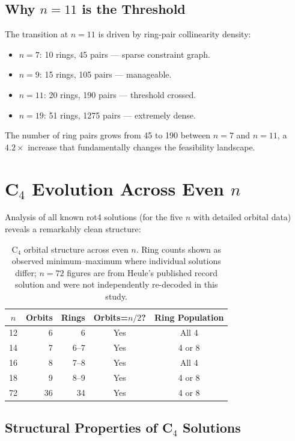 \documentclass[11pt,a4paper]{article}
\theoremstyle{plain}
\theoremstyle{definition}
\begin{document}
\subsection{Why $n=11$ is the Threshold}

The transition at $n=11$ is driven by ring-pair collinearity density:
\begin{itemize}
\item $n=7$: 10 rings, 45 pairs --- sparse constraint graph.
\item $n=9$: 15 rings, 105 pairs --- manageable.
\item $n=11$: 20 rings, 190 pairs --- threshold crossed.
\item $n=19$: 51 rings, 1275 pairs --- extremely dense.
\end{itemize}

The number of ring pairs grows from 45 to 190 between $n=7$ and $n=11$, a $4.2\times$ increase that fundamentally changes the feasibility landscape.

\section{C$_4$ Evolution Across Even $n$}
\label{sec:c4evol}

Analysis of all known rot4 solutions (for the five $n$ with detailed orbital data) reveals a remarkably clean structure:

\begin{table}[H]
\centering
\caption{C$_4$ orbital structure across even $n$. Ring counts shown as observed minimum--maximum where individual solutions differ; $n=72$ figures are from Heule's published record solution and were not independently re-decoded in this study.}
\label{tab:c4evol}
\begin{tabular}{crrcc}
\toprule
$n$ & Orbits & Rings & Orbits=$n/2$? & Ring Population \\
\midrule
12 & 6 & 6 & Yes & All 4 \\
14 & 7 & 6--7 & Yes & 4 or 8 \\
16 & 8 & 7--8 & Yes & All 4 \\
18 & 9 & 8--9 & Yes & 4 or 8 \\
72 & 36 & 34 & Yes & 4 or 8 \\
\bottomrule
\end{tabular}
\end{table}

\subsection{Structural Properties of C$_4$ Solutions}
\end{document}
